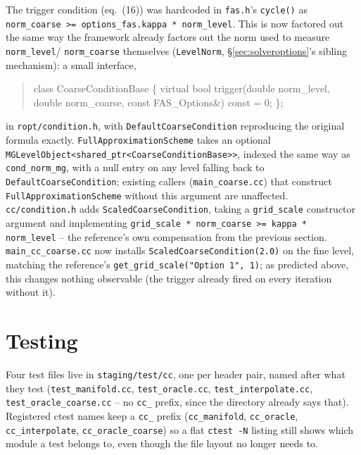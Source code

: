 \documentclass[11pt]{article}
\begin{document}
The trigger condition (eq.~(16)) was hardcoded in \texttt{fas.h}'s \texttt{cycle()} as
\texttt{norm\_coarse >= options\_fas.kappa * norm\_level}. This is now factored out the same
way the framework already factors out the norm used to measure \texttt{norm\_level}/
\texttt{norm\_coarse} themselves (\texttt{LevelNorm}, \S\ref{sec:solveroptions}'s sibling
mechanism): a small interface,
\begin{quote}\ttfamily
class CoarseConditionBase \{ virtual bool trigger(double norm\_level, double norm\_coarse,
const FAS\_Options\&) const = 0; \};
\end{quote}
in \texttt{ropt/condition.h}, with \texttt{DefaultCoarseCondition} reproducing the original
formula exactly. \texttt{FullApproximationScheme} takes an optional
\texttt{MGLevelObject<shared\_ptr<CoarseConditionBase>>}, indexed the same way as
\texttt{cond\_norm\_mg}, with a null entry on any level falling back to
\texttt{DefaultCoarseCondition}; existing callers (\texttt{main\_coarse.cc}) that construct
\texttt{FullApproximationScheme} without this argument are unaffected. \texttt{cc/condition.h}
adds \texttt{ScaledCoarseCondition}, taking a \texttt{grid\_scale} constructor argument and
implementing \texttt{grid\_scale * norm\_coarse >= kappa * norm\_level} -- the reference's own
compensation from the previous section. \texttt{main\_cc\_coarse.cc} now installs
\texttt{ScaledCoarseCondition(2.0)} on the fine level, matching the reference's
\texttt{get\_grid\_scale("Option 1", 1)}; as predicted above, this changes nothing observable
(the trigger already fired on every iteration without it).

\section{Testing}
\label{sec:testing}

Four test files live in \texttt{staging/test/cc}, one per header pair, named after what they test
(\texttt{test\_manifold.cc}, \texttt{test\_oracle.cc}, \texttt{test\_interpolate.cc},
\texttt{test\_oracle\_coarse.cc} -- no \texttt{cc\_} prefix, since the directory already
says that). Registered ctest names keep a \texttt{cc\_} prefix
(\texttt{cc\_manifold}, \texttt{cc\_oracle}, \texttt{cc\_interpolate},
\texttt{cc\_oracle\_coarse}) so a flat \texttt{ctest -N} listing still shows which module a
test belongs to, even though the file layout no longer needs to.
\end{document}
